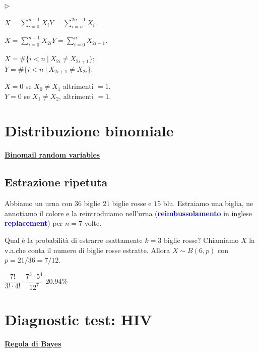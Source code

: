 \documentclass[12pt,openany]{book}
\newcommand{\mylabel}[1]{{\footnotesize\textsf{#1}}\hfill}
\renewenvironment{itemize}
  {\begin{list}{$\triangleright$}{%
   \setlength{\parskip}{0mm}
   \setlength{\topsep}{.2\baselineskip}
   \setlength{\rightmargin}{0mm}
   \setlength{\listparindent}{0mm}
   \setlength{\itemindent}{0mm}
   \setlength{\labelwidth}{3ex}
   \setlength{\itemsep}{.4\baselineskip}
   \setlength{\parsep}{0mm}
   \setlength{\partopsep}{0mm}
   \setlength{\labelsep}{1ex}
   \setlength{\leftmargin}{\labelwidth+\labelsep}
   \let\makelabel\mylabel}}{%
   \end{list}\vspace*{-1.3mm}}
\def\emph#1{\textcolor{blue}{\textbf{\boldmath #1}}}
\theoremstyle{mio}
\theoremstyle{liscio}
\begin{document}
\begin{itemize}
\item[1.] $\displaystyle X=\sum_{i=0}^{n-1}X_i$\qquad $\displaystyle Y=\sum_{i=n}^{2n-1}X_i$.


\item[2.] $\displaystyle X=\sum_{i=0}^{n-1}X_{2i}$\qquad $\displaystyle Y=\sum_{i=0}^{n} X_{2i-1}$.\bigskip

\item[3.] $X= \#\big\{i<n\ |\ X_{2i}\neq X_{2i+1}\big\}$;\\
$Y= \#\big\{i<n\ |\ X_{2i+1}\neq X_{2i}\big\}$.\bigskip

\item[4.] $X=0$ se $X_0\neq X_1$ altrimenti $=1$. \\
$Y=0$ se $X_1\neq X_2$, altrimenti $=1$.

\end{itemize}



\hfill{}\clearpage\section{Distribuzione binomiale}
\hfill\textbf{{\color{brown}\hyperref[Binomial_rv]{Binomail random variables} \faShare}}
\subsection{Estrazione ripetuta}
\label{estrazione_biglie_ripetuta}

Abbiamo un urna con $36$ biglie $21$ biglie rosse e $15$ blu. Estraiamo una biglia, ne annotiamo il colore e la reintroduiamo nell'urna (\emph{reimbussolamento\/} in inglese \emph{replacement\/}) per $n=7$ volte.

Qual è la probabilità di estrarre esattamente $k=3$ biglie rosse? Chiamiamo $X$ la v.a.\@ che conta il numero di biglie rosse estratte. Allora $X\sim B(6,p)$ con $p=21/36=7/12$. 


\medrel{=}$\dfrac{7!}{3!\cdot4!}\cdot\dfrac{7^3\cdot5^4}{12^7}$
\medrel{=}$20.94\%$





\hfill{}\clearpage\section{Diagnostic test: HIV}
\hfill\textbf{{\color{brown}\hyperref[RegolaBayes]{Regola di Bayes} \faShare}}
\label{HIV_test}
\end{document}
